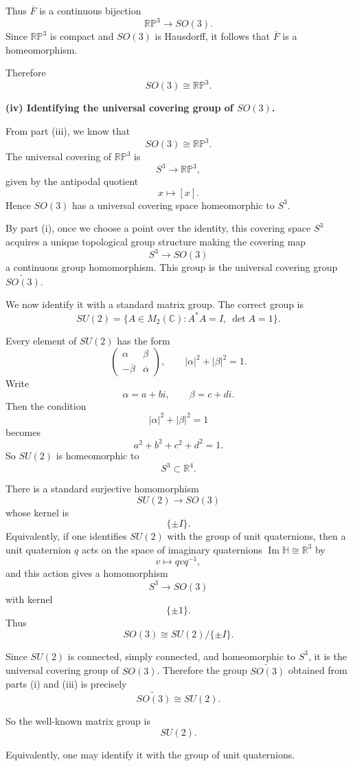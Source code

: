 \begin{solution}
Thus \(\overline{F}\) is a continuous bijection
\[
\mathbb{RP}^3\to SO(3).
\]
Since \(\mathbb{RP}^3\) is compact and \(SO(3)\) is Hausdorff, it follows that \(\overline{F}\) is a homeomorphism.

Therefore
\[
SO(3)\cong \mathbb{RP}^3.
\]

\textbf{(iv) Identifying the universal covering group of \(SO(3)\).}

From part (iii), we know that
\[
SO(3)\cong \mathbb{RP}^3.
\]
The universal covering of \(\mathbb{RP}^3\) is
\[
S^3\to \mathbb{RP}^3,
\]
given by the antipodal quotient
\[
x\mapsto [x].
\]
Hence \(SO(3)\) has a universal covering space homeomorphic to \(S^3\).

By part (i), once we choose a point over the identity, this covering space \(S^3\) acquires a unique topological group structure making the covering map
\[
S^3\to SO(3)
\]
a continuous group homomorphism. This group is the universal covering group \(\widetilde{SO(3)}\).

We now identify it with a standard matrix group. The correct group is
\[
SU(2)=\{A\in M_2(\mathbb C):A^*A=I,\ \det A=1\}.
\]

Every element of \(SU(2)\) has the form
\[
\begin{pmatrix}
	\alpha & \beta\\
	-\overline{\beta} & \overline{\alpha}
\end{pmatrix},
\qquad
|\alpha|^2+|\beta|^2=1.
\]
Write
\[
\alpha=a+bi,
\qquad
\beta=c+di.
\]
Then the condition
\[
|\alpha|^2+|\beta|^2=1
\]
becomes
\[
a^2+b^2+c^2+d^2=1.
\]
So \(SU(2)\) is homeomorphic to
\[
S^3\subset \mathbb R^4.
\]

There is a standard surjective homomorphism
\[
SU(2)\to SO(3)
\]
whose kernel is
\[
\{\pm I\}.
\]
Equivalently, if one identifies \(SU(2)\) with the group of unit quaternions, then a unit quaternion \(q\) acts on the space of imaginary quaternions \(\operatorname{Im}\mathbb H\cong \mathbb R^3\) by
\[
v\mapsto qvq^{-1},
\]
and this action gives a homomorphism
\[
S^3\to SO(3)
\]
with kernel
\[
\{\pm 1\}.
\]
Thus
\[
SO(3)\cong SU(2)/\{\pm I\}.
\]

Since \(SU(2)\) is connected, simply connected, and homeomorphic to \(S^3\), it is the universal covering group of \(SO(3)\). Therefore the group \(\widetilde{SO(3)}\) obtained from parts (i) and (iii) is precisely
\[
\widetilde{SO(3)}\cong SU(2).
\]

So the well-known matrix group is
\[
\boxed{SU(2)}.
\]

Equivalently, one may identify it with the group of unit quaternions.
\end{solution}

